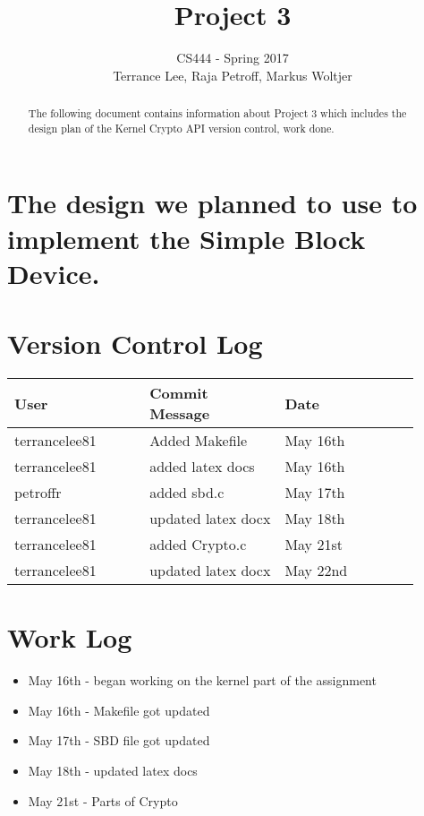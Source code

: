 \documentclass[draftclsnofoot,onecolumn,10pt,compsoc]{IEEEtran}
\begin{document}
\begin{titlepage}
	\title{Project 3}
	\author{CS444 - Spring 2017 \\ Terrance Lee, Raja Petroff, Markus Woltjer}
	\maketitle
	\begin{abstract}
		The following document contains information about Project 3 which includes the design plan of the Kernel Crypto API version control, work done.  
	\end{abstract}
	
	\thispagestyle{empty} %
	
\end{titlepage}

\tableofcontents

\newpage

\section{The design we planned to use to implement the Simple Block Device.}
\section{Version Control Log}
\begin{center}
	\begin{tabular}{| p{0.3\linewidth} | p{0.3\linewidth} | p{0.3\linewidth} |}
		\hline User & Commit Message & Date\\
		\hline terrancelee81 & Added Makefile & May 16th\\
		\hline terrancelee81 & added latex docs& May 16th\\
		\hline petroffr & added sbd.c & May 17th \\ 	
		\hline terrancelee81 & updated latex docx & May 18th\\
		\hline terrancelee81 & added Crypto.c & May 21st\\
		\hline terrancelee81 & updated latex docx & May 22nd\\
	\end{tabular}
\end{center}
\section{Work Log}
\begin{itemize}
	\item May 16th - began working on the kernel part of the assignment
	\item May 16th - Makefile got updated
	\item May 17th - SBD file got updated
	\item May 18th - updated latex docs
	\item May 21st - Parts of Crypto
	
	
	
	
	
\end{itemize}
\end{document}
